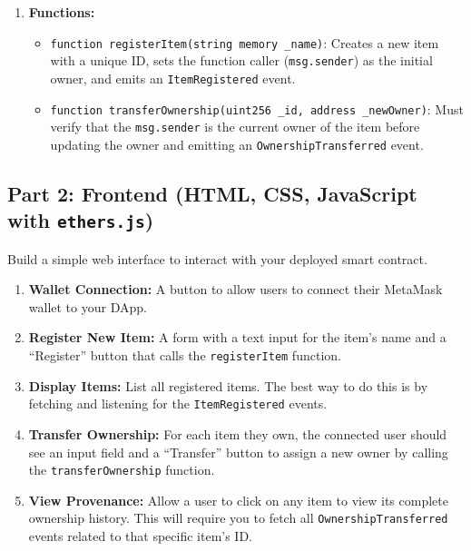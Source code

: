 \documentclass[12pt]{extarticle}
\begin{document}
\begin{enumerate}
    \item \textbf{Functions:}
          \begin{itemize}
              \item \texttt{function registerItem(string memory \_name)}: Creates a new item with a unique ID, sets the function caller (\texttt{msg.sender}) as the initial owner, and emits an \texttt{ItemRegistered} event.
              \item \texttt{function transferOwnership(uint256 \_id, address \_newOwner)}: Must verify that the \texttt{msg.sender} is the current owner of the item before updating the owner and emitting an \texttt{OwnershipTransferred} event.
          \end{itemize}
\end{enumerate}

\subsection*{Part 2: Frontend (HTML, CSS, JavaScript with \texttt{ethers.js})}
Build a simple web interface to interact with your deployed smart contract.
\begin{enumerate}
    \item \textbf{Wallet Connection:} A button to allow users to connect their MetaMask wallet to your DApp.
    \item \textbf{Register New Item:} A form with a text input for the item's name and a ``Register'' button that calls the \texttt{registerItem} function.
    \item \textbf{Display Items:} List all registered items. The best way to do this is by fetching and listening for the \texttt{ItemRegistered} events.
    \item \textbf{Transfer Ownership:} For each item they own, the connected user should see an input field and a ``Transfer'' button to assign a new owner by calling the \texttt{transferOwnership} function.
    \item \textbf{View Provenance:} Allow a user to click on any item to view its complete ownership history. This will require you to fetch all \texttt{OwnershipTransferred} events related to that specific item's ID.
\end{enumerate}
\end{document}

